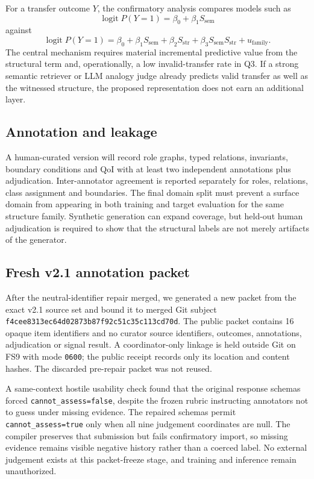 For a transfer outcome $Y$, the confirmatory analysis compares models such as
\[
\operatorname{logit}P(Y=1)=\beta_0+\beta_1 S_{\mathrm{sem}}
\]
against
\[
\operatorname{logit}P(Y=1)=\beta_0+\beta_1 S_{\mathrm{sem}}+\beta_2 S_{\mathrm{str}}+\beta_3S_{\mathrm{sem}}S_{\mathrm{str}}+u_{\mathrm{family}}.
\]
The central mechanism requires material incremental predictive value from the structural term and, operationally, a low invalid-transfer rate in Q3. If a strong semantic retriever or LLM analogy judge already predicts valid transfer as well as the witnessed structure, the proposed representation does not earn an additional layer.

\subsection{Annotation and leakage}

A human-curated version will record role graphs, typed relations, invariants, boundary conditions and QoI with at least two independent annotations plus adjudication. Inter-annotator agreement is reported separately for roles, relations, class assignment and boundaries. The final domain split must prevent a surface domain from appearing in both training and target evaluation for the same structure family. Synthetic generation can expand coverage, but held-out human adjudication is required to show that the structural labels are not merely artifacts of the generator.

\subsection{Fresh v2.1 annotation packet}
After the neutral-identifier repair merged, we generated a new packet from the exact v2.1 source set and bound it to merged Git subject \texttt{f4cee8313ec64d02873b87f92c51c35c113cd70d}. The public packet contains 16 opaque item identifiers and no curator source identifiers, outcomes, annotations, adjudication or signal result. A coordinator-only linkage is held outside Git on FS9 with mode \texttt{0600}; the public receipt records only its location and content hashes. The discarded pre-repair packet was not reused.

A same-context hostile usability check found that the original response schemas forced \texttt{cannot\_assess=false}, despite the frozen rubric instructing annotators not to guess under missing evidence. The repaired schemas permit \texttt{cannot\_assess=true} only when all nine judgement coordinates are null. The compiler preserves that submission but fails confirmatory import, so missing evidence remains visible negative history rather than a coerced label. No external judgement exists at this packet-freeze stage, and training and inference remain unauthorized.
